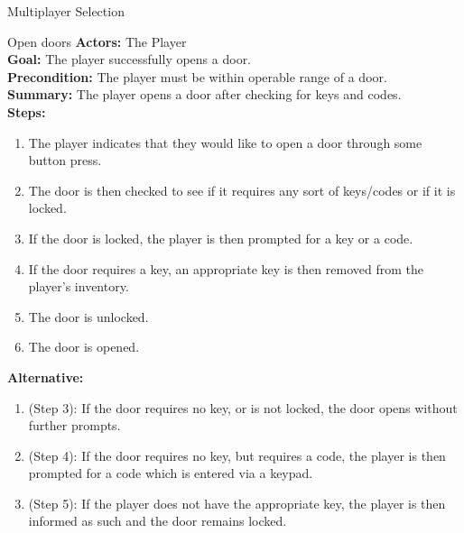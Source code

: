 \documentclass[12pt]{report}
\begin{document}
\begin{subsection}{Multiplayer Selection}
\begin{subsection}{Open doors}
\textbf{Actors:} The Player \\
\textbf{Goal:} The player successfully opens a door. \\
\textbf{Precondition:} The player must be within operable range of a door. \\
\textbf{Summary:} The player opens a door after checking for keys and codes. \\
\textbf{Steps:}
\begin{enumerate}
	\item The player indicates that they would like to open a door through some button press.
	\item The door is then checked to see if it requires any sort of keys/codes or if it is locked.
	\item If the door is locked, the player is then prompted for a key or a code.
	\item If the door requires a key, an appropriate key is then removed from the player's inventory.
	\item The door is unlocked.
	\item The door is opened.
\end{enumerate}
\textbf{Alternative:}
\begin{enumerate}
	\item (Step 3): If the door requires no key, or is not locked, the door opens without further prompts.
	\item (Step 4): If the door requires no key, but requires a code, the player is then prompted for a code which is entered via a keypad.
	\item (Step 5): If the player does not have the appropriate key, the player is then informed as such and the door remains locked.
\end{enumerate}
\end{subsection}


\end{subsection}
\end{document}
